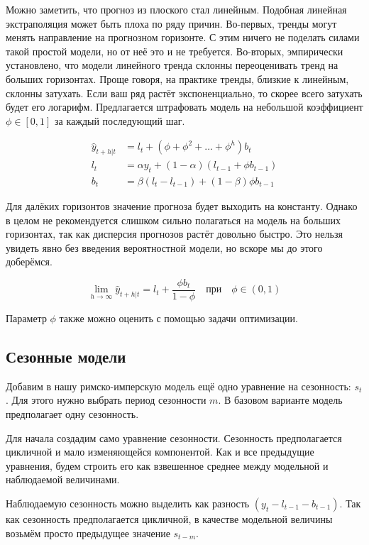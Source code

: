\documentclass[12pt,fleqn]{article}
\begin{document}
Можно заметить, что прогноз из плоского стал линейным. Подобная линейная экстраполяция может быть плоха по ряду причин. Во-первых, тренды могут менять направление на прогнозном горизонте. С этим ничего не поделать силами такой простой модели, но от неё это и не требуется. Во-вторых, эмпирически установлено, что модели линейного тренда склонны переоценивать тренд на больших горизонтах. Проще говоря, на практике тренды, близкие к линейным, склонны затухать. Если ваш ряд растёт экспоненциально, то скорее всего затухать будет его логарифм. Предлагается штрафовать модель на небольшой коэффициент $\phi \in [0, 1]$ за каждый последующий шаг.


\begin{equation}
	\begin{split}
		\hat{y}_{t+h|t } &= l_t + (\phi + \phi^2 + \ldots + \phi^h) b_t \\
		l_t &=\alpha y_t +(1-\alpha)(l_{t-1} + \phi b_{t-1}) \\
		b_t &=\beta (l_t - l_{t-1}) +(1-\beta) \phi b_{t-1}
	\end{split}
\end{equation}

Для далёких горизонтов значение прогноза будет выходить на константу. Однако в целом не рекомендуется слишком сильно полагаться на модель на больших горизонтах, так как дисперсия прогнозов растёт довольно быстро. Это нельзя увидеть явно без введения вероятностной модели, но вскоре мы до этого доберёмся.

\[ \lim\limits_{h\rightarrow\infty} 	\hat{y}_{t+h|t} =  l_t + \frac{\phi b_t}{1-\phi} \quad \text{при} \quad \phi \in (0, 1)\]

Параметр $\phi$ также можно оценить с помощью задачи оптимизации.


\subsection{Сезонные модели}

Добавим в нашу римско-имперскую модель ещё одно уравнение на сезонность: $s_t$.  Для этого нужно выбрать период сезонности $m$. В базовом варианте модель предполагает одну сезонность. 

Для начала создадим само уравнение сезонности. Сезонность предполагается цикличной и мало изменяющейся компонентой. Как и все предыдущие уравнения, будем строить его как взвешенное среднее между модельной и наблюдаемой величинами. 

Наблюдаемую сезонность можно выделить как разность $(y_t - l_{t-1} - b_{t-1})$. Так как сезонность предполагается цикличной, в качестве модельной величины возьмём просто предыдущее значение $s_{t-m}$.
\end{document}
